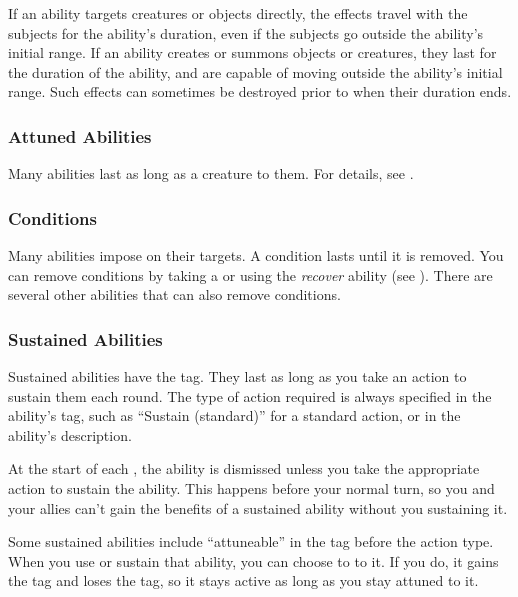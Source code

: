         If an ability targets creatures or objects directly, the effects travel with the subjects for the ability's duration, even if the subjects go outside the ability's initial range.
        If an ability creates or summons objects or creatures, they last for the duration of the ability, and are capable of moving outside the ability's initial range.
        Such effects can sometimes be destroyed prior to when their duration ends.

        \subsubsection{Attuned Abilities}
            Many abilities last as long as a creature  to them.
            For details, see .

        \subsubsection{Conditions}\label{Conditions}
            Many abilities impose  on their targets.
            A condition lasts until it is removed.
            You can remove conditions by taking a  or using the \textit{recover} ability (see ).
            There are several other abilities that can also remove conditions.

        \subsubsection{Sustained Abilities}\label{Sustained Abilities}
            Sustained abilities have the  tag.
            They last as long as you take an action to sustain them each round.
            The type of action required is always specified in the ability's tag, such as ``Sustain (standard)'' for a standard action, or in the ability's description.

            At the start of each , the ability is dismissed unless you take the appropriate action to sustain the ability.
            This happens before your normal turn, so you and your allies can't gain the benefits of a sustained ability without you sustaining it.

            Some sustained abilities include ``attuneable'' in the tag before the action type.
            When you use or sustain that ability, you can choose to  to it.
            If you do, it gains the  tag and loses the  tag, so it stays active as long as you stay attuned to it.

